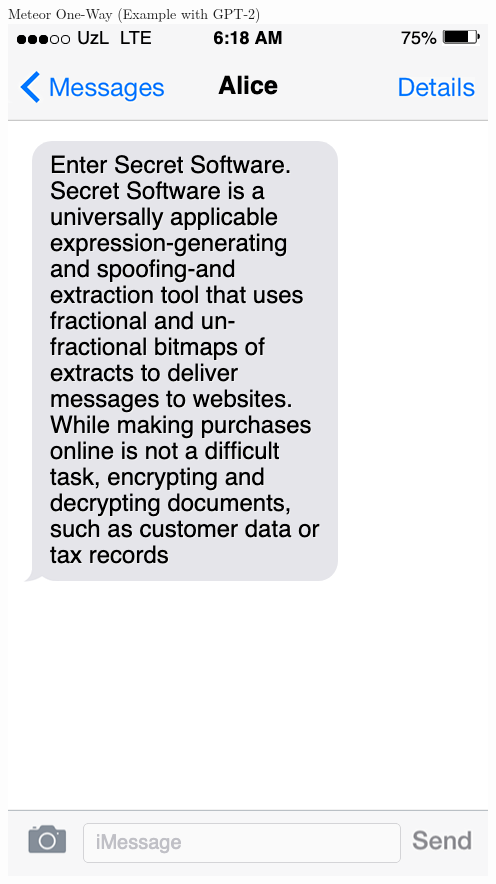 \documentclass[10pt]{beamer}
\begin{document}
\begin{frame}{Meteor One-Way (Example with GPT-2)}
	\centering
	\includegraphics[height=0.9\textheight]{twoway_no_split.png}
\end{frame}
\end{document}
